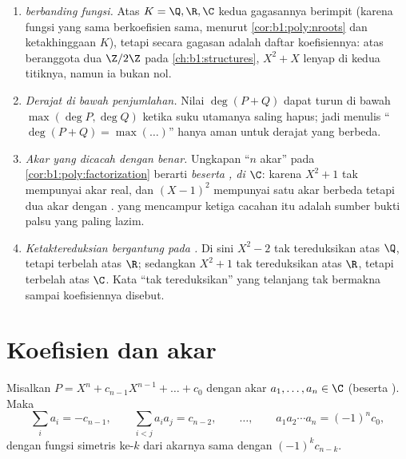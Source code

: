 \begin{remark}\label{rem:b1:poly:pitfalls}
\begin{enumerate}
  \item \emph{ berbanding fungsi.} Atas $K = \Q, \R, \C$
        kedua gagasannya berimpit (karena fungsi yang sama berkoefisien
        sama, menurut \cref{cor:b1:poly:nroots} dan
        ketakhinggaan $K$), tetapi secara gagasan  adalah
        daftar koefisiennya: atas  beranggota dua
        $\Z/2\Z$ pada \cref{ch:b1:structures}, $X^2 + X$ lenyap
        di kedua titiknya, namun ia bukan  nol.
  \item \emph{Derajat di bawah penjumlahan.} Nilai $\deg(P + Q)$ dapat turun
        di bawah $\max(\deg P, \deg Q)$ ketika suku utamanya saling hapus;
        jadi menulis ``$\deg(P + Q) = \max(\dots)$'' hanya aman untuk
        derajat yang berbeda.
  \item \emph{Akar yang dicacah dengan benar.} Ungkapan ``$n$ akar'' pada
        \cref{cor:b1:poly:factorization} berarti \emph{beserta
        , di $\C$}: karena $X^2 + 1$ tak mempunyai akar real, dan
        $(X-1)^2$ mempunyai satu akar berbeda tetapi dua akar dengan
        .  yang mencampur ketiga cacahan itu adalah
        sumber bukti palsu yang paling lazim.
  \item \emph{Ketaktereduksian bergantung pada .} Di sini $X^2 - 2$
        tak tereduksikan atas $\Q$, tetapi terbelah atas $\R$; sedangkan $X^2 + 1$
        tak tereduksikan atas $\R$, tetapi terbelah atas $\C$. Kata
        ``tak tereduksikan'' yang telanjang tak bermakna sampai 
        koefisiennya disebut.
\end{enumerate}
\end{remark}

\section{Koefisien dan akar}

\begin{theorem}\label{thm:b1:poly:vieta}
Misalkan $P = X^n + c_{n-1} X^{n-1} + \dots + c_0$  dengan akar
$a_1, \dots, a_n \in \C$ (beserta ). Maka
\[
\sum_i a_i = -c_{n-1},
\qquad
\sum_{i < j} a_i a_j = c_{n-2},
\qquad \dots, \qquad
a_1 a_2 \cdots a_n = (-1)^n c_0 ,
\]
dengan fungsi simetris ke-$k$ dari akarnya sama dengan $(-1)^k c_{n-k}$.
\end{theorem}

